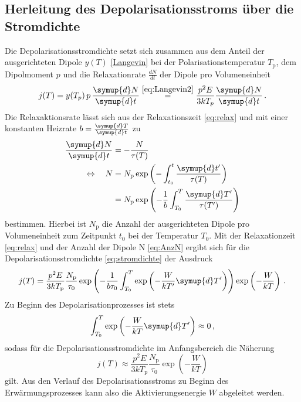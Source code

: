 \subsection*{Herleitung des Depolarisationsstroms über die Stromdichte}
Die Depolarisationsstromdichte setzt sich zusammen aus dem Anteil der ausgerichteten Dipole $y(T)$ \eqref{Langevin} bei der Polarisationstemperatur $T_\text{p}$, dem Dipolmoment $p$ und die Relaxationrate $\frac{dN}{dt}$ der Dipole pro Volumeneinheit
\begin{equation}\label{eq:stromdichte}
    j(T)=y(T_p)\,p\,\frac{\symup{d}N}{\symup{d}t} \stackrel{\eqref{eq:Langevin2}}{=} \frac{p^2 E}{3kT_p}\frac{\symup{d}N}{\symup{d}t} \, .
\end{equation}
Die Relaxaktionsrate lässt sich aus der Relaxationszeit \eqref{eq:relax} und mit einer konstanten Heizrate $b = \frac{\symup{d}T}{\symup{d}t}$ zu
\begin{align}
    \frac{\symup{d}N}{\symup{d}t} & = -\frac{N}{\tau(T)}\notag \\
    \Leftrightarrow \quad N & = N_\text{p}\exp\left(-\int_{t_0}^t \frac{\symup{d}t'}{\tau(T)}\right)\notag \\
    & = N_\text{p}\exp\left(-\frac{1}{b}\int_{T_0}^T \frac{\symup{d}T'}{\tau(T')}\right)\label{eq:AnzN}
\end{align}
bestimmen.
Hierbei ist $N_\text{p}$ die Anzahl der ausgerichteten Dipole pro Volumeneinheit zum Zeitpunkt $t_0$ bei der Temperatur $T_0$.
Mit der Relaxationzeit \eqref{eq:relax} und der Anzahl der Dipole N \eqref{eq:AnzN} ergibt sich für die Depolarisationsstromdichte \eqref{eq:stromdichte} der Ausdruck
\begin{equation}\label{eq:stromdichte2}
    j(T)= \frac{p^2E}{3kT_\text{p}}\frac{N_\text{p}}{\tau_0}\exp\left(-\frac{1}{b\tau_0}\int_{T_0}^T \exp\left(-\frac{W}{kT'}\symup{d}T'\right) \right)\exp\left(-\frac{W}{kT}\right)\, .
\end{equation}
Zu Beginn des Depolarisationprozesses ist stets
\begin{equation}
    \int_{T_0}^T \exp\left(-\frac{W}{kT}\symup{d}T' \right) \approx 0\, ,
\end{equation}
sodass für die Depolarisationsstromdichte im Anfangsbereich die Näherung
\begin{equation}
    j(T)\approx    \frac{p^2 E}{3kT_\text{p}}\frac{N_\text{p}}{\tau_0}\exp\left(-\frac{W}{kT}\right)
\end{equation}
gilt.
Aus den Verlauf des Depolarisationsstroms zu Beginn des Erwärmungsprozesses kann also die Aktivierungsenergie $W$ abgeleitet werden.

